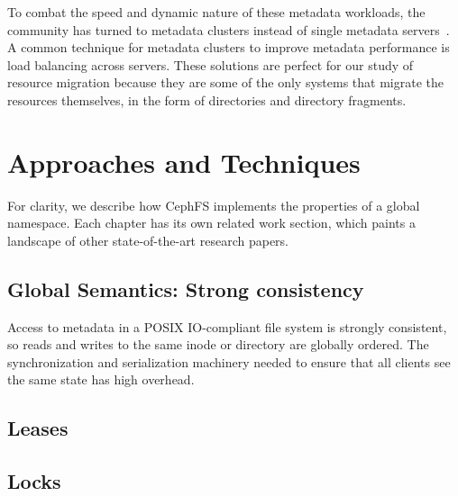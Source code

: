 
To combat the speed and dynamic nature of these metadata workloads, the
community has turned to metadata clusters instead of single metadata
servers~\cite{patil:fast2011-giga+,weil:osdi2006-ceph,weil:sc2004-dyn-metadata,sinnamohideen:atc2010-ursa,xing:sc2009-skyfs}.
A common technique for metadata clusters to improve metadata performance is
load balancing across servers. These solutions are perfect for our study of
resource migration because they are some of the only systems that migrate the
resources themselves, in the form of directories and directory fragments. 






\section{Approaches and Techniques}

For clarity, we describe how CephFS implements the properties of a global
namespace. Each chapter has its own related work section, which paints a
landscape of other state-of-the-art research papers.

\subsection{Global Semantics: Strong consistency}

Access to metadata in a POSIX IO-compliant file system is strongly consistent, so
reads and writes to the same inode or directory are globally ordered.  The
synchronization and serialization machinery needed to ensure that all clients
see the same state has high overhead.

\subsection{Leases}
\subsection{Locks}
